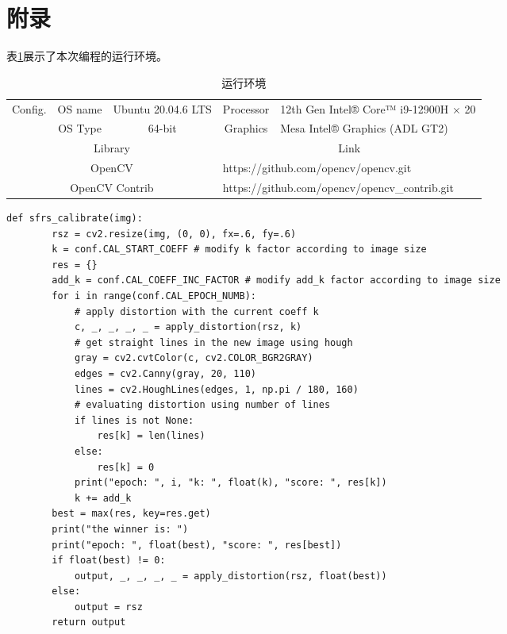 \documentclass[12pt, onecolumn]{article}
\newcommand\normf{\fangsong}
\begin{document}
	\section{\normf 附录}
	表\ref{tab:运行环境}展示了本次编程的运行环境。
	\begin{table}[h]
	\centering
	\caption{\normf 运行环境}
	\label{tab:运行环境}
	\begin{tabular}{ccc|cl}
	\midrule[1pt]
	\multicolumn{1}{c|}{\multirow{2}{*}{Config.}} & OS name & Ubuntu 20.04.6 LTS & Processor          & 12th Gen Intel® Core™ i9-12900H × 20         \\ \cmidrule{2-5} 
	\multicolumn{1}{c|}{}                         & OS Type & 64-bit             & Graphics           & Mesa Intel® Graphics (ADL GT2)               \\ \midrule[1pt]\midrule[1pt]
	\multicolumn{3}{c|}{Library}                                                 & \multicolumn{2}{c}{Link}                                          \\ \midrule
	\multicolumn{3}{c|}{OpenCV}                                                  & \multicolumn{2}{l}{https://github.com/opencv/opencv.git}          \\
	\multicolumn{3}{c|}{OpenCV Contrib}                                          & \multicolumn{2}{l}{https://github.com/opencv/opencv\_contrib.git} \\ \midrule[1pt]
	\end{tabular}
	\end{table}
	
	\begin{lstlisting}[caption={\normf 标定算法实现}]
def sfrs_calibrate(img):
        rsz = cv2.resize(img, (0, 0), fx=.6, fy=.6)
        k = conf.CAL_START_COEFF # modify k factor according to image size
        res = {}
        add_k = conf.CAL_COEFF_INC_FACTOR # modify add_k factor according to image size
        for i in range(conf.CAL_EPOCH_NUMB):
            # apply distortion with the current coeff k
            c, _, _, _, _ = apply_distortion(rsz, k)
            # get straight lines in the new image using hough
            gray = cv2.cvtColor(c, cv2.COLOR_BGR2GRAY)
            edges = cv2.Canny(gray, 20, 110)
            lines = cv2.HoughLines(edges, 1, np.pi / 180, 160)
            # evaluating distortion using number of lines
            if lines is not None:
                res[k] = len(lines)
            else:
                res[k] = 0
            print("epoch: ", i, "k: ", float(k), "score: ", res[k])
            k += add_k
        best = max(res, key=res.get)
        print("the winner is: ")
        print("epoch: ", float(best), "score: ", res[best])
        if float(best) != 0:
            output, _, _, _, _ = apply_distortion(rsz, float(best))
        else:
            output = rsz
        return output
	\end{lstlisting}
	
\end{document}
